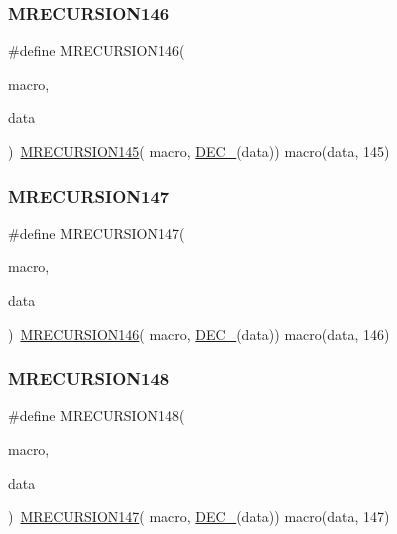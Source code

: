 \subsubsection{\texorpdfstring{MRECURSION146}{MRECURSION146}}
{\footnotesize\ttfamily \#define M\+R\+E\+C\+U\+R\+S\+I\+O\+N146(\begin{DoxyParamCaption}\item[{}]{macro,  }\item[{}]{data }\end{DoxyParamCaption})~\mbox{\hyperlink{group__group__sam0__utils__mrecursion_ga3314ae66e82b16e923a2925e15839602}{M\+R\+E\+C\+U\+R\+S\+I\+O\+N145}}(  macro, \mbox{\hyperlink{group__group__sam0__utils__mrecursion_ga1d23d683797679dca8c3512a54a5dcae}{D\+E\+C\+\_\+}}(data))   macro(data, 145)}

\mbox{\label{group__group__sam0__utils__mrecursion_ga30a38947003689daf96eaf919fa90bbf}} 
\subsubsection{\texorpdfstring{MRECURSION147}{MRECURSION147}}
{\footnotesize\ttfamily \#define M\+R\+E\+C\+U\+R\+S\+I\+O\+N147(\begin{DoxyParamCaption}\item[{}]{macro,  }\item[{}]{data }\end{DoxyParamCaption})~\mbox{\hyperlink{group__group__sam0__utils__mrecursion_ga266f741d92739be1a64e16447fe11eca}{M\+R\+E\+C\+U\+R\+S\+I\+O\+N146}}(  macro, \mbox{\hyperlink{group__group__sam0__utils__mrecursion_ga1d23d683797679dca8c3512a54a5dcae}{D\+E\+C\+\_\+}}(data))   macro(data, 146)}

\mbox{\label{group__group__sam0__utils__mrecursion_ga2bcf729fdb108d8f8cf420b07388906d}} 
\subsubsection{\texorpdfstring{MRECURSION148}{MRECURSION148}}
{\footnotesize\ttfamily \#define M\+R\+E\+C\+U\+R\+S\+I\+O\+N148(\begin{DoxyParamCaption}\item[{}]{macro,  }\item[{}]{data }\end{DoxyParamCaption})~\mbox{\hyperlink{group__group__sam0__utils__mrecursion_ga30a38947003689daf96eaf919fa90bbf}{M\+R\+E\+C\+U\+R\+S\+I\+O\+N147}}(  macro, \mbox{\hyperlink{group__group__sam0__utils__mrecursion_ga1d23d683797679dca8c3512a54a5dcae}{D\+E\+C\+\_\+}}(data))   macro(data, 147)}

